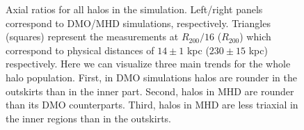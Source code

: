\documentclass[usenatbib]{mnras}
\begin{document}
 
\begin{figure}
\begin{center}
\end{center}
\caption{Axial ratios for all halos in the simulation.
  Left/right panels correspond to DMO/MHD simulations, respectively.
  Triangles (squares) represent the measurements at $R_{200}/16$
  ($R_{200}$) which correspond to physical distances of $14\pm 1$ kpc
  ($230\pm 15$ kpc) respectively.
  Here we can visualize three main trends for the whole halo population.
  First, in DMO simulations halos are rounder in the outskirts
  than in the inner part.
  Second, halos in MHD are rounder than its DMO counterparts.
  Third, halos in MHD are less triaxial in the inner regions than in
  the outskirts.}
  \label{fig:triaxiality_plane}
\end{figure}
\end{document}
